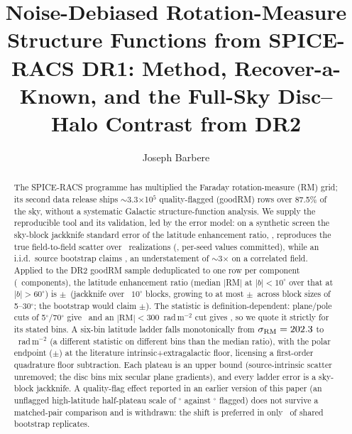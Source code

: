 \documentclass[twocolumn]{aastex631}
\begin{document}
\title{Noise-Debiased Rotation-Measure Structure Functions from SPICE-RACS DR1:
Method, Recover-a-Known, and the Full-Sky Disc--Halo Contrast from DR2}
\author[0009-0008-3289-4447]{Joseph Barbere}

\begin{abstract}
The SPICE-RACS programme has multiplied the Faraday rotation-measure (RM) grid; its second data
release \citep{spiceracs_dr2} ships $\sim$3.3$\times$10$^5$ quality-flagged (goodRM) rows over
87.5\% of the sky, without a systematic Galactic structure-function analysis. We supply the
reproducible tool and its validation, led by the error model: on a synthetic screen the sky-block jackknife standard
error of the latitude enhancement ratio, \rmsSynRatioJkSe, reproduces the true field-to-field
scatter over \rmsSynNReal\ realizations (\rmsSynRatioEnsSd, per-seed values committed), while
an i.i.d.\ source bootstrap claims \rmsSynRatioSe, an understatement of $\sim$3$\times$ on a
correlated field. Applied to the DR2 goodRM sample deduplicated
to one row per component (\rmsRealN\ components),
the latitude enhancement ratio (median $|$RM$|$ at $|b|<10^\circ$ over that at $|b|>60^\circ$)
is \rmsRealRatio$\pm$\rmsRealRatioJkSe\ (jackknife over \rmsRealJkBlocks\ $10^\circ$
blocks, growing to at most $\pm$\rmsRealRatioJkSeMax\ across block sizes of 5--30$^\circ$; the
bootstrap would claim $\pm$\rmsRealRatioSe). The statistic is definition-dependent:
plane/pole cuts of 5$^\circ$/70$^\circ$ give \rmsRealRatioAltBins\ and an
$|\mathrm{RM}|<300$~rad\,m$^{-2}$ cut gives \rmsRealRatioCutThree, so we quote it strictly
for its stated bins. A six-bin latitude ladder
falls monotonically from $\sigma_\mathrm{RM}=202.3$ to \rmsRealSigPole~rad\,m$^{-2}$
(a different statistic on different bins than the median ratio), with
the polar endpoint (\rmsRealFloorSig$\pm$\rmsRealFloorSigJkErr) at the literature
intrinsic+extragalactic floor, licensing a first-order quadrature floor subtraction. Each
plateau is an upper bound (source-intrinsic scatter unremoved; the disc bins mix secular plane
gradients), and every ladder error is a sky-block jackknife. A quality-flag effect
reported in an earlier version of this paper (an unflagged high-latitude half-plateau scale
of \rmsRealBreakHiUnflagged$^\circ$ against \rmsRealBreakHiFlagM$^\circ$ flagged) does not
survive a matched-pair comparison and is withdrawn: the shift is preferred in only
\rmsRealBreakFracSmall\ of shared bootstrap replicates.
\end{abstract}
\end{document}
